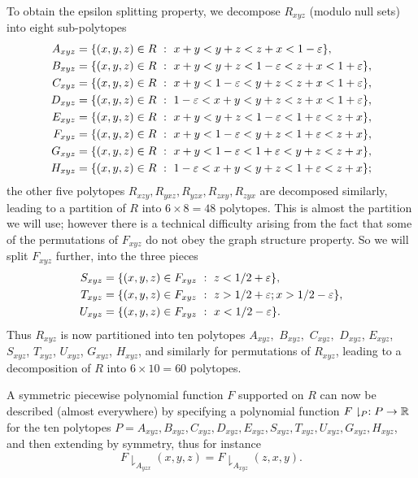 To obtain the epsilon splitting property, we decompose $R_{xyz}$ (modulo null sets) into eight sub-polytopes
\begin{align*}
A_{xyz} & =\{(x,y,z)\in R\ :\ x+y< y+z< z+x< 1-\varepsilon\},\\
B_{xyz} & =\{(x,y,z)\in R\ :\ x+y< y+z< 1-\varepsilon< z+x< 1+\varepsilon\},\\
C_{xyz} & =\{(x,y,z)\in R\ :\ x+y< 1-\varepsilon < y+z < z+x< 1+\varepsilon\},\\
D_{xyz} & =\{(x,y,z)\in R\ :\ 1-\varepsilon < x+y<  y+z < z+x< 1+\varepsilon\},\\
E_{xyz} & =\{(x,y,z)\in R\ :\ x+y< y+z< 1-\varepsilon <  1+\varepsilon < z+x\},\\
F_{xyz} & =\{(x,y,z)\in R\ :\ x+y< 1-\varepsilon < y+z <  1+\varepsilon < z+x\},\\
G_{xyz} & =\{(x,y,z)\in R\ :\ x+y< 1-\varepsilon  <  1+\varepsilon < y+z < z+x\},\\
H_{xyz} & =\{(x,y,z)\in R\ :\ 1-\varepsilon < x+y<  y+z < 1+\varepsilon < z+x\};
\end{align*}
the other five polytopes $R_{xzy}, R_{yxz}, R_{yzx}, R_{zxy}, R_{zyx}$ are decomposed similarly, leading to a partition of $R$ into $6 \times 8 = 48$ polytopes.
This is almost the partition we will use; however there is a technical difficulty arising from the fact that some of the permutations of $F_{xyz}$ do not obey the graph structure property.  So we will split $F_{xyz}$ further, into the three pieces
\begin{align*}
S_{xyz} & = \{(x,y,z)\in F_{xyz}\ :\ z< 1/2+\varepsilon\},\\
T_{xyz} & = \{(x,y,z)\in F_{xyz}\ :\ z> 1/2+\varepsilon;x> 1/2-\varepsilon \}, \\
U_{xyz} & = \{(x,y,z)\in F_{xyz}\ :\ x< 1/2-\varepsilon \}.
\end{align*}
Thus $R_{xyz}$ is now partitioned into ten polytopes $A_{xyz},$ $B_{xyz},$ $C_{xyz},$ $D_{xyz}$, $E_{xyz}$, $S_{xyz}$, $T_{xyz}$, $U_{xyz}$, $G_{xyz}$, $H_{xyz}$, and similarly for permutations of $R_{xyz}$, leading to a decomposition of $R$ into $6 \times 10 = 60$ polytopes.


A symmetric piecewise polynomial function $F$ supported on $R$ can now be described (almost everywhere) by specifying a polynomial function $F\downharpoonright_{P}: P \to \mathbb{R}$ for the ten polytopes $P = A_{xyz}, B_{xyz}, C_{xyz}, D_{xyz}, E_{xyz},  S_{xyz}, T_{xyz}, U_{xyz}, G_{xyz}, H_{xyz}$, and then extending by symmetry, thus for instance
$$ F\downharpoonright_{A_{yzx}}(x,y,z) = F\downharpoonright_{A_{xyz}}(z,x,y).$$


